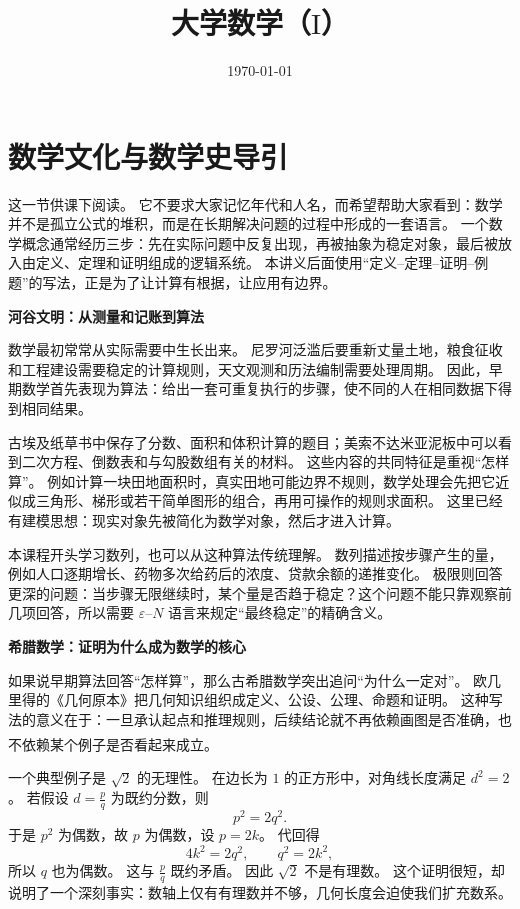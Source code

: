 \documentclass[fontset=fandol]{ctexart}
\title{大学数学（$ \mathrm{I} $）}
\author{}
\date{\today}
\newcommand{\upcite}[1]{\textsuperscript{\textsuperscript{\cite{#1}}}}
\begin{document}
\maketitle
\vspace{-1em}

\renewcommand{\contentsname}{\hspace*{\fill}\Large\bfseries 目\quad 录 \hspace*{\fill}}
\setcounter{tocdepth}{2}
\tableofcontents

\clearpage
\section*{数学文化与数学史导引}

这一节供课下阅读。 它不要求大家记忆年代和人名，而希望帮助大家看到：数学并不是孤立公式的堆积，而是在长期解决问题的过程中形成的一套语言。 一个数学概念通常经历三步：先在实际问题中反复出现，再被抽象为稳定对象，最后被放入由定义、定理和证明组成的逻辑系统。 本讲义后面使用“定义--定理--证明--例题”的写法，正是为了让计算有根据，让应用有边界。

\textbf{河谷文明：从测量和记账到算法}

数学最初常常从实际需要中生长出来。 尼罗河泛滥后要重新丈量土地，粮食征收和工程建设需要稳定的计算规则，天文观测和历法编制需要处理周期。 因此，早期数学首先表现为算法：给出一套可重复执行的步骤，使不同的人在相同数据下得到相同结果。

古埃及纸草书中保存了分数、面积和体积计算的题目；美索不达米亚泥板中可以看到二次方程、倒数表和与勾股数组有关的材料。 这些内容的共同特征是重视“怎样算”。 例如计算一块田地面积时，真实田地可能边界不规则，数学处理会先把它近似成三角形、梯形或若干简单图形的组合，再用可操作的规则求面积。 这里已经有建模思想：现实对象先被简化为数学对象，然后才进入计算。

本课程开头学习数列，也可以从这种算法传统理解。 数列描述按步骤产生的量，例如人口逐期增长、药物多次给药后的浓度、贷款余额的递推变化。 极限则回答更深的问题：当步骤无限继续时，某个量是否趋于稳定？这个问题不能只靠观察前几项回答，所以需要 $\varepsilon$--$N$ 语言来规定“最终稳定”的精确含义。

\textbf{希腊数学：证明为什么成为数学的核心}

如果说早期算法回答“怎样算”，那么古希腊数学突出追问“为什么一定对”。 欧几里得的《几何原本》把几何知识组织成定义、公设、公理、命题和证明。 这种写法的意义在于：一旦承认起点和推理规则，后续结论就不再依赖画图是否准确，也不依赖某个例子是否看起来成立。\upcite{MacTutorGreek}

一个典型例子是 $\sqrt2$ 的无理性。 在边长为 $1$ 的正方形中，对角线长度满足 $d^2=2$。 若假设 $d=\frac pq$ 为既约分数，则
\[
p^2=2q^2.
\]
于是 $p^2$ 为偶数，故 $p$ 为偶数，设 $p=2k$。 代回得
\[
4k^2=2q^2,\qquad q^2=2k^2,
\]
所以 $q$ 也为偶数。 这与 $\frac pq$ 既约矛盾。 因此 $\sqrt2$ 不是有理数。 这个证明很短，却说明了一个深刻事实：数轴上仅有有理数并不够，几何长度会迫使我们扩充数系。
\end{document}
